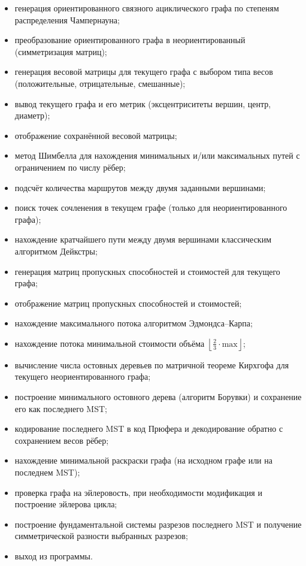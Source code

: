 \begin{itemize}
	\item генерация ориентированного связного ациклического графа по степеням распределения Чампернауна;
	\item преобразование ориентированного графа в неориентированный (симметризация матриц);
	\item генерация весовой матрицы для текущего графа с выбором типа весов (положительные, отрицательные, смешанные);
	\item вывод текущего графа и его метрик (эксцентриситеты вершин, центр, диаметр);
	\item отображение сохранённой весовой матрицы;
	\item метод Шимбелла для нахождения минимальных и/или максимальных путей с ограничением по числу рёбер;
	\item подсчёт количества маршрутов между двумя заданными вершинами;
	\item поиск точек сочленения в текущем графе (только для неориентированного графа);
	\item нахождение кратчайшего пути между двумя вершинами классическим алгоритмом Дейкстры;
	\item генерация матриц пропускных способностей и стоимостей для текущего графа;
	\item отображение матриц пропускных способностей и стоимостей;
	\item нахождение максимального потока алгоритмом Эдмондса–Карпа;
	\item нахождение потока минимальной стоимости объёма $\left\lfloor \frac{2}{3} \cdot \text{max} \right\rfloor$;
	\item вычисление числа остовных деревьев по матричной теореме Кирхгофа для текущего неориентированного графа;
	\item построение минимального остовного дерева (алгоритм Борувки) и сохранение его как последнего MST;
	\item кодирование последнего MST в код Прюфера и декодирование обратно с сохранением весов рёбер;
	\item нахождение минимальной раскраски графа (на исходном графе или на последнем MST);
	\item проверка графа на эйлеровость, при необходимости модификация и построение эйлерова цикла;
	\item построение фундаментальной системы разрезов последнего MST и получение симметрической разности выбранных разрезов;
	\item выход из программы.
\end{itemize}

